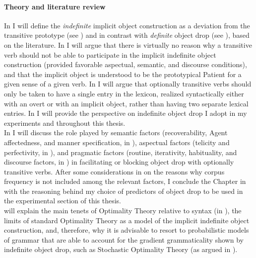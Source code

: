\paragraph{Theory and literature review}
In  I will define the \textit{indefinite} implicit object construction as a deviation from the transitive prototype (see ) and in contrast with \textit{definite} object drop (see ), based on the literature. In  I will argue that there is virtually no reason why a transitive verb should not be able to participate in the implicit indefinite object construction (provided favorable aspectual, semantic, and discourse conditions), and that the implicit object is understood to be the prototypical Patient for a given sense of a given verb. In  I will argue that optionally transitive verbs should only be taken to have a single entry in the lexicon, realized syntactically either with an overt or with an implicit object, rather than having two separate lexical entries. In  I will provide the perspective on indefinite object drop I adopt in my experiments and throughout this thesis.\\
In  I will discuss the role played by semantic factors (recoverability, Agent affectedness, and manner specification, in ), aspectual factors (telicity and perfectivity, in ), and pragmatic factors (routine, iterativity, habituality, and discourse factors, in ) in facilitating or blocking object drop with optionally transitive verbs. After some considerations in  on the reasons why corpus frequency is not included among the relevant factors, I conclude the Chapter in  with the reasoning behind my choice of predictors of object drop to be used in the experimental section of this thesis.\\
 will explain the main tenets of Optimality Theory relative to syntax (in ), the limits of standard Optimality Theory as a model of the implicit indefinite object construction, and, therefore, why it is advisable to resort to probabilistic models of grammar that are able to account for the gradient grammaticality shown by indefinite object drop, such as Stochastic Optimality Theory (as argued in ).\\
